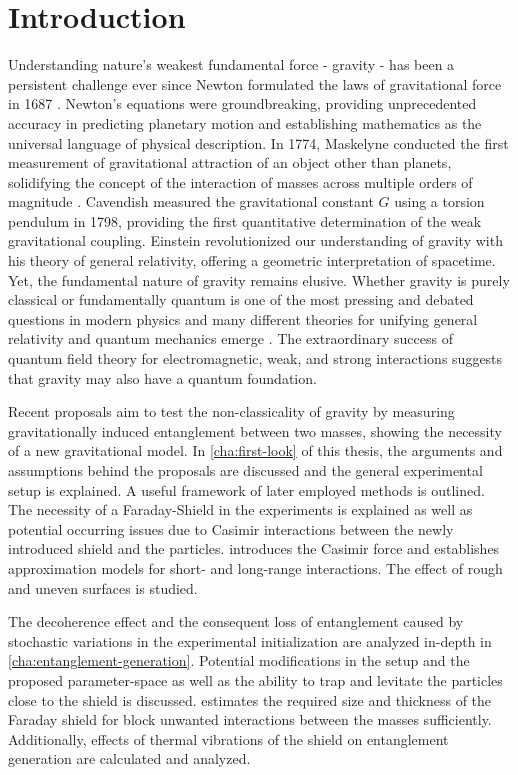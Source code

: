 \chapter{Introduction}\label{cha:introduction}

Understanding nature's weakest fundamental force - gravity - has been a persistent challenge ever since Newton formulated the laws of gravitational force in 1687 \cite{Newton_1687}.
Newton's equations were groundbreaking, providing unprecedented accuracy in predicting planetary motion and establishing mathematics as the universal language of physical description.
In 1774, Maskelyne conducted the first measurement of gravitational attraction of an object other than planets, solidifying the concept of the interaction of masses across multiple orders of magnitude \cite{Maskelyne_1775,Davies_1985}. 
Cavendish measured the gravitational constant $G$ using a torsion pendulum in 1798, providing the first quantitative determination of the weak gravitational coupling.
Einstein revolutionized our understanding of gravity with his theory of general relativity, offering a geometric interpretation of spacetime. Yet, the fundamental nature of gravity remains elusive. Whether gravity is purely classical or fundamentally quantum is one of the most pressing and debated questions in modern physics and many different theories for unifying general relativity and quantum mechanics emerge \cite{Becker_2007, Ashtekar_1986, Oppenheim_2023}.
The extraordinary success of quantum field theory for electromagnetic, weak, and strong interactions suggests that gravity may also have a quantum foundation.

Recent proposals \cite{Bose_2017,Marletto_2017} aim to test the non-classicality of gravity by measuring gravitationally induced entanglement between two masses, showing the necessity of a new gravitational model.
In \cref{cha:first-look} of this thesis, the arguments and assumptions behind the proposals are discussed and the general experimental setup is explained. A useful framework of later employed methods is outlined.
The necessity of a Faraday-Shield in the experiments is explained as well as potential occurring issues due to Casimir interactions \cite{Casimir_1948} between the newly introduced shield and the particles.
 introduces the Casimir force and establishes approximation models for short- and long-range interactions. The effect of rough and uneven surfaces is studied.

The decoherence effect and the consequent loss of entanglement caused by stochastic variations in the experimental initialization are analyzed in-depth in \cref{cha:entanglement-generation}. Potential modifications in the setup and the proposed parameter-space as well as the ability to trap and levitate the particles close to the shield is discussed. 
 estimates the required size and thickness of the Faraday shield for block unwanted interactions between the masses sufficiently. Additionally, effects of thermal vibrations of the shield on entanglement generation are calculated and analyzed.